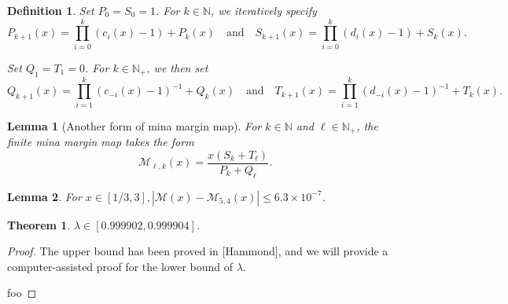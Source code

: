 \documentclass{article}
\newtheorem{theorem}{Theorem}
\newtheorem{definition}{Definition}
\newtheorem{lemma}{Lemma}
\begin{document}
\begin{definition}
    Set $P_0=S_0=1$. For $k\in\mathbb{N}$, we iteratively specify 
    $$P_{k+1}(x)=\prod_{i=0}^{k}(c_i(x)-1) + P_{k}(x) \quad \text{and} \quad S_{k+1}(x) =
    \prod_{i=0}^{k}(d_i(x)-1) + S_{k}(x).$$

    Set $Q_1=T_1=0$. For $k\in\mathbb{N}_+$, we then set 
    $$Q_{k+1}(x)=\prod_{i=1}^{k}(c_{-i}(x)-1)^{-1} + Q_k(x) \quad \text{and} \quad T_{k+1}(x) =
    \prod_{i=1}^{k}(d_{-i}(x)-1)^{-1} + T_k(x).$$
\end{definition}

\begin{lemma}[Another form of mina margin map]
    For $k\in\mathbb{N}$ and $\ell\in\mathbb{N}_+$, the finite mina margin map takes the form 
    $$\mathcal{M}_{\ell, k}(x)=\frac{x(S_k+T_\ell)}{P_k+Q_\ell}.$$
\end{lemma}
\begin{lemma}
    For $x\in[1/3, 3], |\mathcal{M}(x)-\mathcal{M}_{5,4}(x)| \leq 6.3\times 10^{-7}$.
\end{lemma}

\begin{theorem}
    $\lambda \in [0.999902, 0.999904]$.
\end{theorem}
\begin{proof}
    The upper bound has been proved in [Hammond], and we will provide a computer-assisted proof for
    the lower bound of $\lambda$.

    foo
\end{proof}
\end{document}
